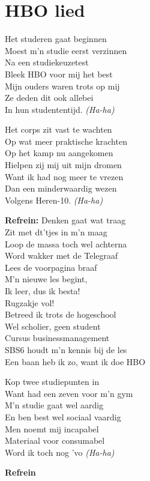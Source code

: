 \section{HBO lied}
Het studeren gaat beginnen\\
Moest m'n studie eerst verzinnen\\
Na een studiekeuzetest\\
Bleek HBO voor mij het best\\
Mijn ouders waren trots op mij\\
Ze deden dit ook allebei\\
In hun studententijd. \textit{(Ha-ha)}

Het corps zit vast te wachten\\
Op wat meer praktische krachten\\
Op het kamp nu aangekomen\\
Hielpen zij mij uit mijn dromen\\
Want ik had nog meer te vrezen\\
Dan een minderwaardig wezen\\
Volgens Heren-10. \textit{(Ha-ha)}

\textbf{Refrein:}
Denken gaat wat traag\\
Zit met dt'tjes in m'n maag\\
Loop de massa toch wel achterna\\
Word wakker met de Telegraaf\\
Lees de voorpagina braaf\\
M'n nieuwe les begint,\\
Ik leer, dus ik besta!\\
Rugzakje vol!\\
Betreed ik trots de hogeschool\\
Wel scholier, geen student\\
Cursus businessmanagement\\
SBS6 houdt m'n kennis bij de les\\
Een baan heb ik zo, want ik doe HBO

Kop twee studiepunten in\\
Want had een zeven voor m'n gym\\
M'n studie gaat wel aardig\\
En ben best wel sociaal vaardig\\
Men noemt mij incapabel\\
Materiaal voor consumabel\\
Word ik toch nog 'vo \textit{(Ha-ha)}

\textbf{Refrein}


